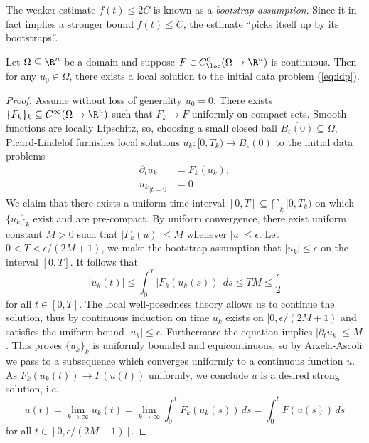 \begin{remark}
	The weaker estimate $f(t) \leq 2C$ is known as a \emph{bootstrap assumption}. Since it in fact implies a stronger bound $f(t) \leq C$, the estimate ``picks itself up by its bootstraps''. 
\end{remark}

\begin{theorem}
	Let $\Omega \subseteq \R^n$ be a domain and suppose $F \in C^0_{\loc} (\Omega \to \R^n)$ is continuous. Then for any $u_0 \in \Omega$, there exists a local solution to the initial data problem (\ref{eq:idp}).
\end{theorem}

\begin{proof}
	Assume without loss of generality $u_0 = 0$. There exists $\{ F_k \}_k \subseteq C^\infty (\Omega \to \R^n)$ such that $F_k \to F$ uniformly on compact sets. Smooth functions are locally Lipschitz, so, choosing a small closed ball $\overline{B_\epsilon (0)} \subseteq \Omega$, Picard-Lindelof furnishes local solutions $u_k : [0, T_k) \to B_\epsilon (0)$ to the initial data problems
	\begin{align*}
		\partial_t u_k 	
			&= F_k(u_k), \\
		{u_k}_{|t = 0}		
			&= 0
	\end{align*}
	We claim that there exists a uniform time interval $[0, T] \subseteq \bigcap_k [0, T_k)$ on which $\{u_k\}_k$ exist and are pre-compact. By uniform convergence, there exist uniform constant $M > 0$ such that $|F_k (u)| \leq M$ whenever $|u| \leq \epsilon$. Let $0 < T < \epsilon/(2M + 1)$, we make the bootstrap assumption that $|u_k| \leq \epsilon$ on the interval $[0, T]$. It follows that
		\[ |u_k (t)| \leq \int_0^T |F_k (u_k (s))| \, ds \leq T M \leq \frac\epsilon2 \]
	for all $t \in [0, T]$. The local well-posedness theory allows us to continue the solution, thus by continuous induction on time $u_k$ exists on $[0, \epsilon/(2M + 1)$ and satisfies the uniform bound $|u_k| \leq \epsilon$. Furthermore the equation implies $|\partial_t u_k| \leq M$. This proves $\{u_k\}_k$ is uniformly bounded and equicontinuous, so by Arzela-Ascoli we pass to a subsequence which converges uniformly to a continuous function $u$. As $F_k (u_k (t)) \to F(u(t))$ uniformly, we conclude $u$ is a desired strong solution, i.e. 
		\[ u(t) = \lim_{k \to \infty} u_k (t) = \lim_{k \to \infty} \int_0^t F_k (u_k (s)) \, ds = \int_0^t F (u(s)) \, ds\]
	for all $t \in [0, \epsilon/(2M + 1)]$. 	
\end{proof}


